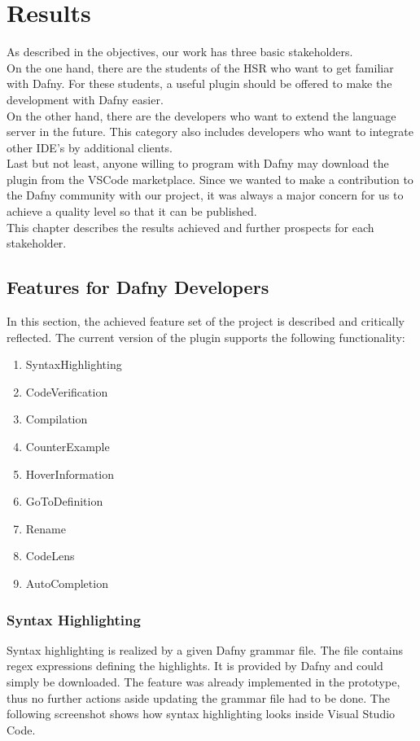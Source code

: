 \section{Results}
\label{section:results}
As described in the objectives, our work has three basic stakeholders. \\

On the one hand, there are the students of the HSR who want to get familiar with Dafny.
For these students, a useful plugin should be offered to make the development with Dafny easier. \\

On the other hand, there are the developers who want to extend the language server in the future.
This category also includes developers who want to integrate other IDE's by additional clients.\\

Last but not least, anyone willing to program with Dafny may download the plugin from the VSCode marketplace.
Since we wanted to make a contribution to the Dafny community with our project,
it was always a major concern for us to achieve a quality level so that it can be published.\\

This chapter describes the results achieved and further prospects for each stakeholder.

\subsection{Features for Dafny Developers}
In this section, the achieved feature set of the project is described and critically reflected.
The current version of the plugin supports the following functionality:
\begin{enumerate}
    \item SyntaxHighlighting
    \item CodeVerification       %
    \item Compilation
    \item CounterExample
    \item HoverInformation
    \item GoToDefinition
    \item Rename
    \item CodeLens
    \item AutoCompletion
\end{enumerate}

\subsubsection{Syntax Highlighting}
\label{section:result:syntaxhighgliht}
Syntax highlighting is realized by a given Dafny grammar file.
The file contains regex expressions defining the highlights.
It is provided by Dafny \cite{syntax_update} and could simply be downloaded.
The feature was already implemented in the prototype, thus no further actions aside updating the grammar file had to be done.
The following screenshot shows how syntax highlighting looks inside Visual Studio Code.


